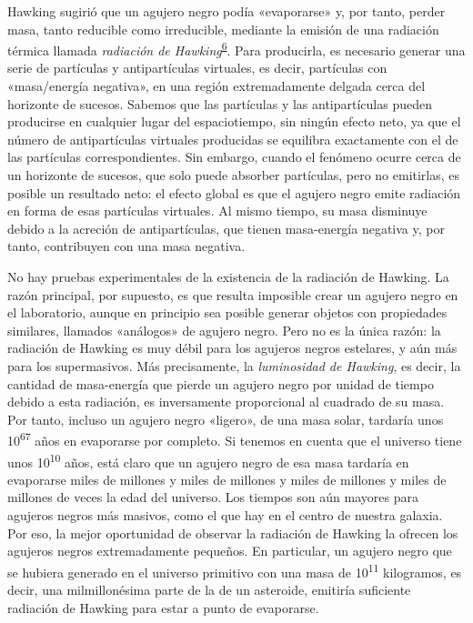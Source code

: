Hawking sugirió que un agujero negro podía «evaporarse» y, por tanto, perder masa, tanto reducible como irreducible, mediante la emisión de una radiación térmica llamada \emph{radiación de Hawking}\textsuperscript{\hyperlink{note:06-06}{6}}. Para producirla, es necesario generar una serie de partículas y antipartículas virtuales, es decir, partículas con «masa/energía negativa», en una región extremadamente delgada cerca del horizonte de sucesos. Sabemos que las partículas y las antipartículas pueden producirse en cualquier lugar del espaciotiempo, sin ningún efecto neto, ya que el número de antipartículas virtuales producidas se equilibra exactamente con el de las partículas correspondientes. Sin embargo, cuando el fenómeno ocurre cerca de un horizonte de sucesos, que solo puede absorber partículas, pero no emitirlas, es posible un resultado neto: el efecto global es que el agujero negro emite radiación en forma de esas partículas virtuales. Al mismo tiempo, su masa disminuye debido a la acreción de antipartículas, que tienen masa-energía negativa y, por tanto, contribuyen con una masa negativa.

No hay pruebas experimentales de la existencia de la radiación de Hawking. La razón principal, por supuesto, es que resulta imposible crear un agujero negro en el laboratorio, aunque en principio sea posible generar objetos con propiedades similares, llamados «análogos» de agujero negro. Pero no es la única razón: la radiación de Hawking es muy débil para los agujeros negros estelares, y aún más para los supermasivos. Más precisamente, la \emph{luminosidad de Hawking}, es decir, la cantidad de masa-energía que pierde un agujero negro por unidad de tiempo debido a esta radiación, es inversamente proporcional al cuadrado de su masa. Por tanto, incluso un agujero negro «ligero», de una masa solar, tardaría unos 10\textsuperscript{67} años en evaporarse por completo. Si tenemos en cuenta que el universo tiene unos 10\textsuperscript{10} años, está claro que un agujero negro de esa masa tardaría en evaporarse miles de millones y miles de millones y miles de millones y miles de millones de veces la edad del universo. Los tiempos son aún mayores para agujeros negros más masivos, como el que hay en el centro de nuestra galaxia. Por eso, la mejor oportunidad de observar la radiación de Hawking la ofrecen los agujeros negros extremadamente pequeños. En particular, un agujero negro que se hubiera generado en el universo primitivo con una masa de 10\textsuperscript{11} kilogramos, es decir, una milmillonésima parte de la de un asteroide, emitiría suficiente radiación de Hawking para estar a punto de evaporarse.

